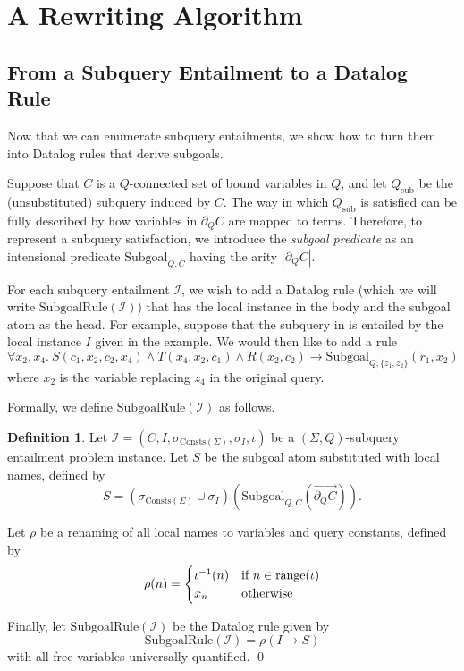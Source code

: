 \documentclass[12pt]{report}
\theoremstyle{plain}
\theoremstyle{definition}
\newtheorem{definition}[theorem]{Definition}
\def\Consts{{\mathrm{Consts}}}
\newcommand{\range}[1]{\ensuremath{\normalfont{\operatorname{range}}\!\left( #1 \right)}}
\begin{document}
\section{A Rewriting Algorithm}
\label{section:a-rewriting-algorithm}

\subsection{From a Subquery Entailment to a Datalog Rule}
\label{subsection:subquery-entailment-to-datalog-rule}

Now that we can enumerate subquery entailments, we show how to turn them into Datalog rules that derive subgoals.

Suppose that $C$ is a $Q$-connected set of bound variables in $Q$, and let $Q_\mathrm{sub}$ be the (unsubstituted) subquery induced by $C$. The way in which $Q_\mathrm{sub}$ is satisfied can be fully described by how variables in $\partial_Q C$ are mapped to terms. Therefore, to represent a subquery satisfaction, we introduce the \emph{subgoal predicate} as an intensional predicate $\mathrm{Subgoal}_{Q, C}$ having the arity $|\partial_Q C|$.

For each subquery entailment $\mathcal{I}$, we wish to add a Datalog rule (which we will write $\mathrm{SubgoalRule}(\mathcal{I})$) that has the local instance in the body and the subgoal atom as the head.
For example, suppose that the subquery in  is entailed by the local instance $I$ given in the example. We would then like to add a rule $$
  \forall x_2, x_4.\ S(c_1, x_2, c_2, x_4) \wedge T(x_4, x_2, c_1) \wedge R(x_2, c_2) \rightarrow \mathrm{Subgoal}_{Q, \{z_1, z_2\}}(r_1, x_2)
$$
where $x_2$ is the variable replacing $z_4$ in the original query.

Formally, we define $\mathrm{SubgoalRule}(\mathcal{I})$ as follows.

\begin{definition}
\label{definition:subgoal-rule}
  Let $\mathcal{I} = (C, I, \sigma_{\Consts(\Sigma)}, \sigma_I, \iota)$ be a $(\Sigma, Q)$-subquery entailment problem instance. Let $S$ be the subgoal atom substituted with local names, defined by $$
    S = (\sigma_{\Consts(\Sigma)} \cup \sigma_I)\left(\mathrm{Subgoal}_{Q, C}\left(\overrightarrow{\partial_Q C}\right)\right).
  $$

  Let $\rho$ be a renaming of all local names to variables and query constants, defined by $$
    \rho(n) = \begin{cases}
      \iota^{-1}(n) & \text{if } n \in \range{\iota} \\
      x_n & \text{otherwise}
    \end{cases}
  $$

  Finally, let $\mathrm{SubgoalRule}(\mathcal{I})$ be the Datalog rule given by $$
    \mathrm{SubgoalRule}(\mathcal{I}) = \rho\left(I \rightarrow S\right)
  $$ with all free variables universally quantified.
  \qed
\end{definition}
\end{document}
